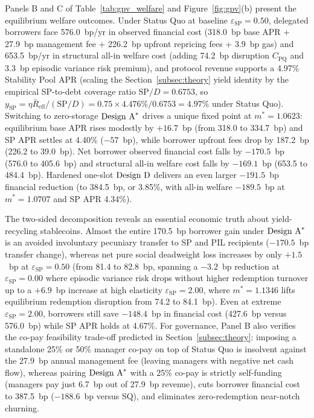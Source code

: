 Panels B and C of Table~\ref{tab:gpv_welfare} and Figure~\ref{fig:gpv}(b) present the equilibrium welfare outcomes. Under Status Quo at baseline $\varepsilon_{\text{SP}} = 0.50$, delegated borrowers face 576.0~bp/yr in observed financial cost (318.0~bp base APR + 27.9~bp management fee + 226.2~bp upfront repricing fees + 3.9~bp gas) and 653.5~bp/yr in structural all-in welfare cost (adding 74.2~bp disruption $C_{\text{PQ}}$ and 3.3~bp episodic variance risk premium), and protocol revenue supports a 4.97\% Stability Pool APR (scaling the Section~\ref{subsec:theory} yield identity by the empirical SP-to-debt coverage ratio $\text{SP}/D = 0.6753$, so $y_{\text{SP}} = \eta \bar{R}_{\text{eff}} / (\text{SP}/D) = 0.75 \times 4.476\% / 0.6753 = 4.97\%$ under Status Quo). Switching to zero-storage $\text{Design A}^*$ drives a unique fixed point at $m^* = 1.0623$: equilibrium base APR rises modestly by $+16.7$~bp (from 318.0 to 334.7~bp) and SP APR settles at 4.40\% ($-57$~bp), while borrower upfront fees drop by 187.2~bp (226.2 to 39.0~bp). Net borrower observed financial cost falls by $-170.5$~bp (576.0 to 405.6~bp) and structural all-in welfare cost falls by $-169.1$~bp (653.5 to 484.4~bp). Hardened one-slot $\text{Design D}$ delivers an even larger $-191.5$~bp financial reduction (to 384.5~bp, or 3.85\%, with all-in welfare $-189.5$~bp at $m^* = 1.0707$ and SP APR 4.34\%).

The two-sided decomposition reveals an essential economic truth about yield-recycling stablecoins. Almost the entire 170.5~bp borrower gain under $\text{Design A}^*$ is an avoided involuntary pecuniary transfer to SP and PIL recipients ($-170.5$~bp transfer change), whereas net pure social deadweight loss increases by only $+1.5$~bp at $\varepsilon_{\text{SP}} = 0.50$ (from 81.4 to 82.8~bp, spanning a $-3.2$~bp reduction at $\varepsilon_{\text{SP}} = 0.00$ where episodic variance risk drops without higher redemption turnover up to a $+6.9$~bp increase at high elasticity $\varepsilon_{\text{SP}} = 2.00$, where $m^* = 1.1346$ lifts equilibrium redemption disruption from 74.2 to 84.1~bp). Even at extreme $\varepsilon_{\text{SP}} = 2.00$, borrowers still save $-148.4$~bp in financial cost (427.6~bp versus 576.0~bp) while SP APR holds at 4.67\%. For governance, Panel B also verifies the co-pay feasibility trade-off predicted in Section~\ref{subsec:theory}: imposing a standalone 25\% or 50\% manager co-pay on top of Status Quo is insolvent against the 27.9~bp annual management fee (leaving managers with negative net cash flow), whereas pairing $\text{Design A}^*$ with a 25\% co-pay is strictly self-funding (managers pay just 6.7~bp out of 27.9~bp revenue), cuts borrower financial cost to 387.5~bp ($-188.6$~bp versus SQ), and eliminates zero-redemption near-notch churning.


